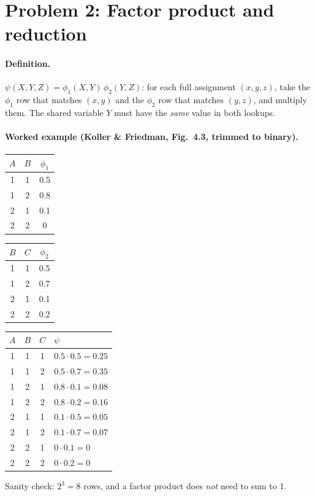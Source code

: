 \documentclass[11pt]{article}
\begin{document}
\section*{Problem 2: Factor product and reduction}

\paragraph{Definition.} $\psi(X,Y,Z) = \phi_1(X,Y)\,\phi_2(Y,Z)$: for each
full assignment $(x,y,z)$, take the $\phi_1$ row that matches $(x,y)$ and
the $\phi_2$ row that matches $(y,z)$, and multiply them. The shared variable
$Y$ must have the \emph{same} value in both lookups.

\paragraph{Worked example (Koller \& Friedman, Fig.~4.3, trimmed to binary).}
\begin{center}
\begin{tabular}{cc|c}
  \toprule $A$ & $B$ & $\phi_1$ \\ \midrule
  1&1&0.5\\ 1&2&0.8\\ 2&1&0.1\\ 2&2&0\\ \bottomrule
\end{tabular}
\qquad
\begin{tabular}{cc|c}
  \toprule $B$ & $C$ & $\phi_2$ \\ \midrule
  1&1&0.5\\ 1&2&0.7\\ 2&1&0.1\\ 2&2&0.2\\ \bottomrule
\end{tabular}
\qquad
\begin{tabular}{ccc|l}
  \toprule $A$&$B$&$C$&$\psi$\\ \midrule
  1&1&1& $0.5\cdot0.5=0.25$\\
  1&1&2& $0.5\cdot0.7=0.35$\\
  1&2&1& $0.8\cdot0.1=0.08$\\
  1&2&2& $0.8\cdot0.2=0.16$\\
  2&1&1& $0.1\cdot0.5=0.05$\\
  2&1&2& $0.1\cdot0.7=0.07$\\
  2&2&1& $0\cdot0.1=0$\\
  2&2&2& $0\cdot0.2=0$\\ \bottomrule
\end{tabular}
\end{center}
Sanity check: $2^3 = 8$ rows, and a factor product does \emph{not} need to
sum to 1.
\end{document}
